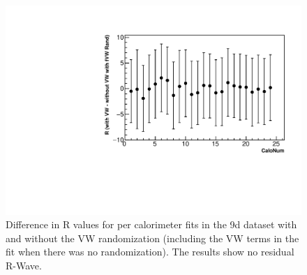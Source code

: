\documentclass[12pt,letterpaper]{article}
\begin{document}
\begin{figure}[]
    \centering
    \includegraphics[width=.6\textwidth]{Rdiffs_noRWave}
    \caption[]{Difference in R values for per calorimeter fits in the 9d dataset with and without the VW randomization (including the VW terms in the fit when there was no randomization). The results show no residual R-Wave.}
    \label{fig:residualRWaveCheck}
\end{figure}



\printbibliography





\end{document}
